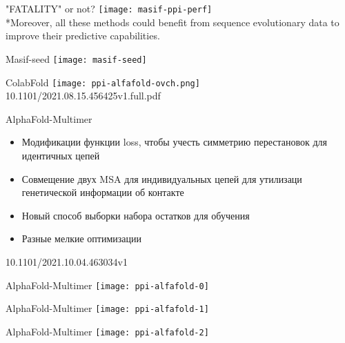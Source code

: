 \begin{frame}{"FATALITY" or not?}
    \texttt{[image: masif-ppi-perf]}\\
*Moreover, all these methods could benefit from sequence evolutionary data to improve their predictive capabilities.
\end{frame}

\begin{frame}{Masif-seed}
    \centering
    \texttt{[image: masif-seed]}\\
\end{frame}


\begin{frame}{ColabFold}
    \centering
    \texttt{[image: ppi-alfafold-ovch.png]}\\
    \footnotesize 10.1101/2021.08.15.456425v1.full.pdf
\end{frame}



\begin{frame}{AlphaFold-Multimer}
    \begin{itemize}
        \item Модификации функции loss, чтобы учесть симметрию перестановок для идентичных  цепей
        \item Совмещение двух  MSA для индивидуальных  цепей для утилизаци генетической информации об контакте
        \item Новый способ выборки набора остатков для обучения
        \item Разные мелкие оптимизации
    \end{itemize}
    \footnotesize 10.1101/2021.10.04.463034v1
\end{frame}

\begin{frame}{AlphaFold-Multimer}
    \centering
    \texttt{[image: ppi-alfafold-0]}\\
\end{frame}

\begin{frame}{AlphaFold-Multimer}
    \centering
    \texttt{[image: ppi-alfafold-1]}\\
\end{frame}

\begin{frame}{AlphaFold-Multimer}
    \centering
    \texttt{[image: ppi-alfafold-2]}\\
\end{frame}



